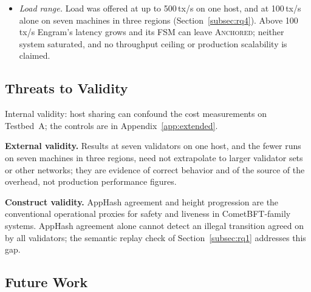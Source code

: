 \begin{itemize}
  \item \emph{Load range.} Load was offered at up to 500\,tx/s on one host, and at 100\,tx/s alone on seven machines in three regions
  (Section~\ref{subsec:rq4}). Above 100\,tx/s Engram's latency grows and its
  FSM can leave \textsc{Anchored}; neither system saturated, and no throughput
  ceiling or production scalability is claimed.
\end{itemize}

\subsection{Threats to Validity}
\label{subsec:sim-to-real}

Internal validity: host sharing can confound the cost measurements on Testbed~A; the controls are in Appendix~\ref{app:extended}.

\textbf{External validity.} Results at seven validators on one host, and the fewer runs on seven machines in three regions, need not
extrapolate to larger validator sets or other networks; they are
evidence of correct behavior and of the source of the overhead, not production
performance figures.

\textbf{Construct validity.} AppHash agreement and height progression are the
conventional operational proxies for safety and liveness in CometBFT-family
systems. AppHash agreement alone cannot detect an illegal transition agreed on
by all validators; the semantic replay check of Section~\ref{subsec:rq1}
addresses this gap.

\subsection{Future Work}
\label{subsec:future-work}


